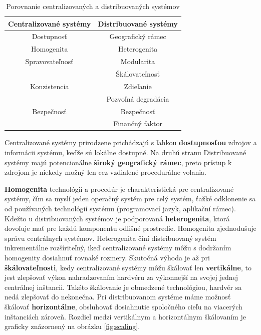 \begin{table} [ht]
\begin{center}
	\begin{tabular}{| c | c |} 
		\hline
		Centralizované systémy & Distribuované systémy \\ [0.5ex] 
		\hline\hline
		Dostupnosť & Geografický rámec \\ 
		Homogenita & Heterogenita \\
		Spravovateľnosť & Modularita \\
		 & Škálovateľnosť \\
		 Konzistencia & Zdieľanie \\
		 & Pozvoľná degradácia \\
		 Bezpečnosť & Bezpečnosť \\
		 & Finančný faktor \\ [1ex] 
		\hline
	\end{tabular}
\end{center}
\caption{Porovnanie centralizovaných a distribuovaných systémov}
\label{Tab:central_vs_distr}
\end{table}

Centralizované systémy prirodzene prichádzajú s ľahkou \textbf{dostupnosťou} zdrojov a informácii systému, keďže sú lokálne dostupné. Na druhú stranu Distribuované systémy majú potencionálne \textbf{široký geografický rámec}, preto prístup k zdrojom je niekedy možný len cez vzdialené procedurálne volania.

 \textbf{Homogenita} technológií a procedúr je charakteristická pre centralizované systémy, čím sa myslí jeden operačný systém pre celý systém, ťažké odklonenie sa od používaných technológií systému (programovací jazyk, aplikační rámec). Kdežto u distribuovaných systémov je podporovaná \textbf{heterogenita}, ktorá dovoľuje mať pre každú komponentu odlišné prostredie. Homogenita zjednodušuje správu centrálnych systémov. Heterogenita činí distribuovaný systém inkrementálne rozšíriteľný, ikeď centralizované systémy môžu s dodržaním homogenity dosiahnuť rovnaké rozmery. Skutočná výhoda je až pri \textbf{škálovateľnosti}, kedy centralizované systémy môžu škálovať len \textbf{vertikálne}, to jest zlepšovať výkon nahradzovaním hardvéru za výkonnejší na svojej jednej centrálnej inštancii. Takéto škálovanie je obmedzené technológiou, hardvér sa nedá zlepšovať do nekonečna. Pri distribuovanom systéme máme možnosť škálovať \textbf{horizontálne}, obsluhovať dosiahnutie spoločného cieľu na viacerých inštanciách zároveň. Rozdieľ medzi vertikálnym a horizontálnym škálovaním je graficky znázornený na obrázku \ref{fig:scaling}. 

